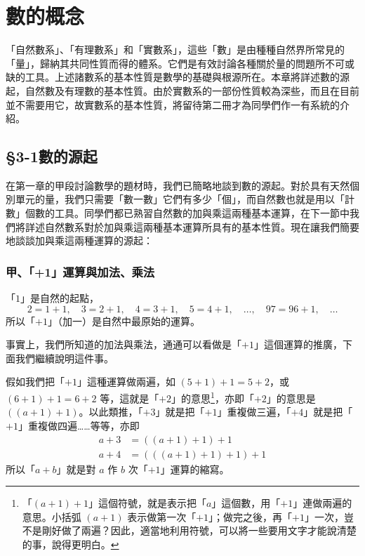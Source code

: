 
\section{數的概念}\label{sec:ch3}

「自然數系」、「有理數系」和「實數系」，這些「數」是由種種自然界所常見的「量」，歸納其共同性質而得的體系。它們是有效討論各種關於量的問題所不可或缺的工具。上述諸數系的基本性質是數學的基礎與根源所在。本章將詳述數的源起，自然數及有理數的基本性質。由於實數系的一部份性質較為深些，而且在目前並不需要用它，故實數系的基本性質，將留待第二冊才為同學們作一有系統的介紹。

\subsection{\S 3-1\quad 數的源起}\label{sec:3-1}

在第一章的甲段討論數學的題材時，我們已簡略地談到數的源起。對於具有天然個別單元的量，我們只需要「數一數」它們有多少「個」，而自然數也就是用以「計數」個數的工具。同學們都已熟習自然數的加與乘這兩種基本運算，在下一節中我們將詳述自然數系對於加與乘這兩種基本運算所具有的基本性質。現在讓我們簡要地談談加與乘這兩種運算的源起：

\subsubsection*{甲、「+1」運算與加法、乘法}\label{subsec:plus_one}

「$1$」是自然的起點，
\begin{equation}\label{eq:count_start}
  2 = 1+1, \quad 3 = 2+1, \quad 4 = 3+1, \quad 5 = 4+1, \quad \dots, \quad 97 = 96+1, \quad \dots
\end{equation}
所以「$+1$」（加一）是自然中最原始的運算。

事實上，我們所知道的加法與乘法，通通可以看做是「$+1$」這個運算的推廣，下面我們繼續說明這件事。

假如我們把「$+1$」這種運算做兩遍，如 $(5+1)+1 = 5+2$，或 $(6+1)+1 = 6+2$ 等，這就是「$+2$」的意思\footnote{\label{fn:plus_two}「$(a+1)+1$」這個符號，就是表示把「$a$」這個數，用「$+1$」連做兩遍的意思。小括弧 $(a+1)$ 表示做第一次「$+1$」；做完之後，再「$+1$」一次，豈不是剛好做了兩遍？因此，適當地利用符號，可以將一些要用文字才能說清楚的事，說得更明白。}，亦即「$+2$」的意思是 $((a+1)+1)$。以此類推，「$+3$」就是把「$+1$」重複做三遍，「$+4$」就是把「$+1$」重複做四遍……等等，亦即
\begin{align}
  a+3 &= ((a+1)+1)+1 \label{eq:add_three}\\
  a+4 &= (((a+1)+1)+1)+1 \label{eq:add_four}
\end{align}
所以「$a+b$」就是對 $a$ 作 $b$ 次「$+1$」運算的縮寫。

